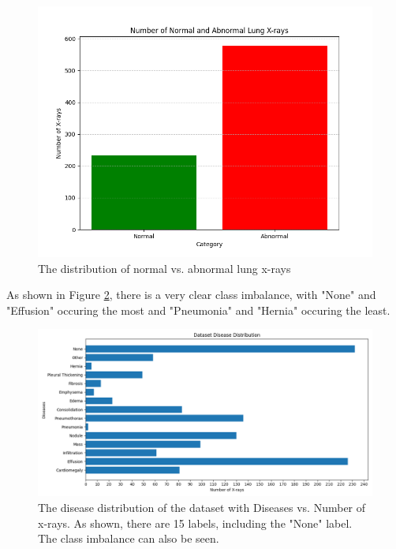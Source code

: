 \documentclass{article}
\theoremstyle{plain}
\theoremstyle{definition}
\theoremstyle{remark}
\begin{document}
\begin{figure}[!h]
    \centering
    \includegraphics[scale=0.405]{normal_vs_abnormal}
    \caption{The distribution of normal vs. abnormal lung x-rays}
    \label{fig:normalvabnormal}
\end{figure}

As shown in Figure \ref{fig:datasetdistribution}, there is a very clear class imbalance, with "None"
and "Effusion" occuring the most and "Pneumonia" and "Hernia" occuring the least. 

\begin{figure}[!h]
    \centering
    \includegraphics[scale=0.55]{disease_distr}
    \caption{The disease distribution of the dataset with Diseases vs. Number of x-rays.
    As shown, there are 15 labels, including the "None" label. The class imbalance can also be seen.}
    \label{fig:datasetdistribution}
\end{figure}
\end{document}
